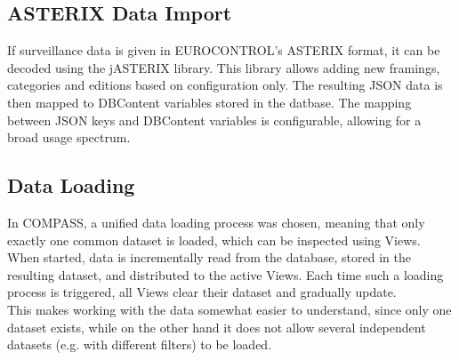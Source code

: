 \subsection*{ASTERIX Data Import}
If surveillance data is given in EUROCONTROL's ASTERIX format, it can be decoded using the jASTERIX library. This library allows adding new framings, categories and editions based on configuration only. The resulting JSON data is then mapped to DBContent variables stored in the datbase. The mapping between JSON keys and DBContent variables is configurable, allowing for a broad usage spectrum.


\subsection*{Data Loading}
In COMPASS, a unified data loading process was chosen, meaning that only exactly one common dataset is loaded, which can be inspected using Views. When started, data is incrementally read from the database, stored in the resulting dataset, and distributed to the active Views. Each time such a loading process is triggered, all Views clear their dataset and gradually update. \\
This makes working with the data somewhat easier to understand, since only one dataset exists, while on the other hand it does not allow several independent datasets (e.g. with different filters) to be loaded.


 
